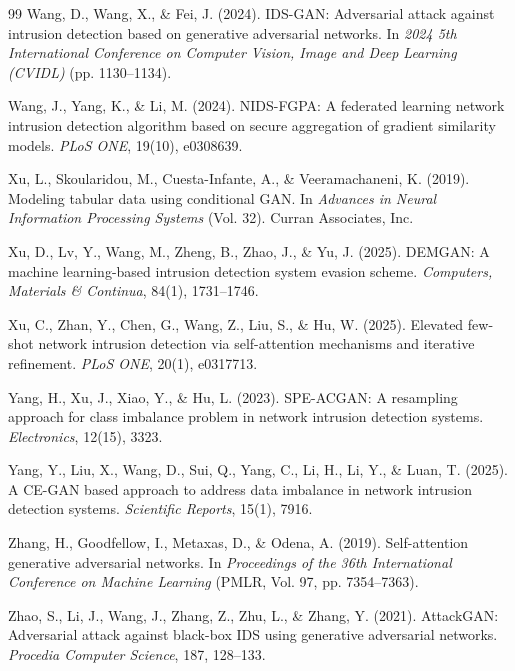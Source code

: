 \documentclass[11pt, a4paper]{article}
\begin{document}
\begin{thebibliography}{99}
Wang, D., Wang, X., \& Fei, J. (2024). IDS-GAN: Adversarial attack against intrusion detection based on generative adversarial networks. In \textit{2024 5th International Conference on Computer Vision, Image and Deep Learning (CVIDL)} (pp. 1130--1134).

Wang, J., Yang, K., \& Li, M. (2024). NIDS-FGPA: A federated learning network intrusion detection algorithm based on secure aggregation of gradient similarity models. \textit{PLoS ONE}, 19(10), e0308639.

Xu, L., Skoularidou, M., Cuesta-Infante, A., \& Veeramachaneni, K. (2019). Modeling tabular data using conditional GAN. In \textit{Advances in Neural Information Processing Systems} (Vol. 32). Curran Associates, Inc.

Xu, D., Lv, Y., Wang, M., Zheng, B., Zhao, J., \& Yu, J. (2025). DEMGAN: A machine learning-based intrusion detection system evasion scheme. \textit{Computers, Materials \& Continua}, 84(1), 1731--1746.

Xu, C., Zhan, Y., Chen, G., Wang, Z., Liu, S., \& Hu, W. (2025). Elevated few-shot network intrusion detection via self-attention mechanisms and iterative refinement. \textit{PLoS ONE}, 20(1), e0317713.

Yang, H., Xu, J., Xiao, Y., \& Hu, L. (2023). SPE-ACGAN: A resampling approach for class imbalance problem in network intrusion detection systems. \textit{Electronics}, 12(15), 3323.

Yang, Y., Liu, X., Wang, D., Sui, Q., Yang, C., Li, H., Li, Y., \& Luan, T. (2025). A CE-GAN based approach to address data imbalance in network intrusion detection systems. \textit{Scientific Reports}, 15(1), 7916.

Zhang, H., Goodfellow, I., Metaxas, D., \& Odena, A. (2019). Self-attention generative adversarial networks. In \textit{Proceedings of the 36th International Conference on Machine Learning} (PMLR, Vol. 97, pp. 7354--7363).

Zhao, S., Li, J., Wang, J., Zhang, Z., Zhu, L., \& Zhang, Y. (2021). AttackGAN: Adversarial attack against black-box IDS using generative adversarial networks. \textit{Procedia Computer Science}, 187, 128--133.

\end{thebibliography}
\end{document}
